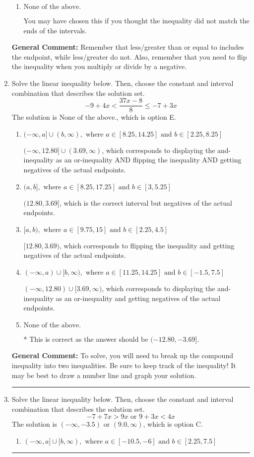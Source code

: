 \documentclass{extbook}[14pt]
\newcommand{\litem}[1]{\item #1

\rule{\textwidth}{0.4pt}}
\begin{document}
\begin{enumerate}
{\begin{enumerate}[label=\Alph*.]
 $(-\infty, 0.071]$, which corresponds to switching the direction of the interval. You likely did this if you did not flip the inequality when dividing by a negative!
\item \( \text{None of the above}. \)

You may have chosen this if you thought the inequality did not match the ends of the intervals.
\end{enumerate}

\textbf{General Comment:} Remember that less/greater than or equal to includes the endpoint, while less/greater do not. Also, remember that you need to flip the inequality when you multiply or divide by a negative.
}
\litem{
Solve the linear inequality below. Then, choose the constant and interval combination that describes the solution set.
\[ -9 + 4 x < \frac{37 x - 8}{8} \leq -7 + 3 x \]The solution is \( \text{None of the above.} \), which is option E.\begin{enumerate}[label=\Alph*.]
\item \( (-\infty, a] \cup (b, \infty), \text{ where } a \in [8.25, 14.25] \text{ and } b \in [2.25, 8.25] \)

$(-\infty, 12.80] \cup (3.69, \infty)$, which corresponds to displaying the and-inequality as an or-inequality AND flipping the inequality AND getting negatives of the actual endpoints.
\item \( (a, b], \text{ where } a \in [8.25, 17.25] \text{ and } b \in [3, 5.25] \)

$(12.80, 3.69]$, which is the correct interval but negatives of the actual endpoints.
\item \( [a, b), \text{ where } a \in [9.75, 15] \text{ and } b \in [2.25, 4.5] \)

$[12.80, 3.69)$, which corresponds to flipping the inequality and getting negatives of the actual endpoints.
\item \( (-\infty, a) \cup [b, \infty), \text{ where } a \in [11.25, 14.25] \text{ and } b \in [-1.5, 7.5] \)

$(-\infty, 12.80) \cup [3.69, \infty)$, which corresponds to displaying the and-inequality as an or-inequality and getting negatives of the actual endpoints.
\item \( \text{None of the above.} \)

* This is correct as the answer should be $(-12.80, -3.69]$.
\end{enumerate}

\textbf{General Comment:} To solve, you will need to break up the compound inequality into two inequalities. Be sure to keep track of the inequality! It may be best to draw a number line and graph your solution.
}
\litem{
Solve the linear inequality below. Then, choose the constant and interval combination that describes the solution set.
\[ -7 + 7 x > 9 x \text{ or } 9 + 3 x < 4 x \]The solution is \( (-\infty, -3.5) \text{ or } (9.0, \infty) \), which is option C.\begin{enumerate}[label=\Alph*.]
\item \( (-\infty, a] \cup [b, \infty), \text{ where } a \in [-10.5, -6] \text{ and } b \in [2.25, 7.5] \)


\end{enumerate}}
\end{enumerate}
\end{document}

